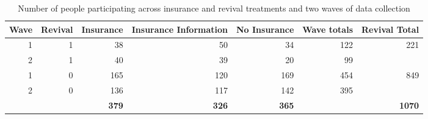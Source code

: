 \begin{table}[ht]
\centering
\begin{adjustbox}{width=\textwidth}\begin{tabular}{rr|rrr|rr}
  \hline
\textbf{ Wave } & \textbf{ Revival } & \textbf{ Insurance } & \textbf{ Insurance Information } & \textbf{ No Insurance } & \textbf{ Wave totals } & \textbf{ Revival Total } \\ 
  \hline
1 & 1 & 38 & 50 & 34 & 122 & 221 \\ 
  2 & 1 & 40 & 39 & 20 & 99 &  \\ 
  1 & 0 & 165 & 120 & 169 & 454 & 849 \\ 
  2 & 0 & 136 & 117 & 142 & 395 &  \\ 
   &  & \textbf{ 379 } & \textbf{ 326 } & \textbf{ 365 } &  & \textbf{ 1070 } \\ 
   \hline
\end{tabular}\end{adjustbox}
\caption{Number of people participating across insurance and revival treatments and two waves of data collection} 
\label{treatment_counts}
\end{table}

